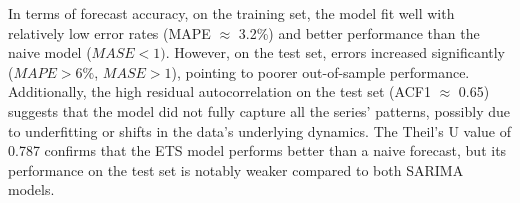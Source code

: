 In terms of forecast accuracy, on the training set, the model fit well with relatively low error rates (MAPE $\approx$ 3.2\%) and better performance than the naive model ($MASE < 1)$. However, on the test set, errors increased significantly ($MAPE > 6\%$, $MASE > 1$), pointing to poorer out-of-sample performance. Additionally, the high residual autocorrelation on the test set (ACF1 $\approx$ 0.65) suggests that the model did not fully capture all the series' patterns, possibly due to underfitting or shifts in the data's underlying dynamics. The Theil's U value of 0.787 confirms that the ETS model performs better than a naive forecast, but its performance on the test set is notably weaker compared to both SARIMA models.\\


